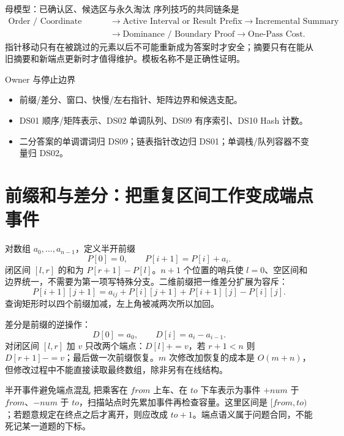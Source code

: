 \documentclass[UTF8,fontset=none,11pt,a4paper]{ctexart}
\begin{document}

\begin{corebox}{母模型：已确认区、候选区与永久淘汰}
序列技巧的共同链条是
\[
\begin{aligned}
\text{Order / Coordinate Contract}
&\to\text{Active Interval or Result Prefix}
\to\text{Incremental Summary}\\
&\to\text{Dominance / Boundary Proof}
\to\text{One-Pass Cost}.
\end{aligned}
\]
指针移动只有在被跳过的元素以后不可能重新成为答案时才安全；摘要只有在能从旧摘要和新端点更新时才值得维护。模板名称不是正确性证明。
\end{corebox}

\begin{methodbox}{Owner 与停止边界}
\begin{itemize}
\item {}前缀/差分、窗口、快慢/左右指针、矩阵边界和候选支配。
\item {}DS01 顺序/矩阵表示、DS02 单调队列、DS09 有序索引、DS10 Hash 计数。
\item {}二分答案的单调谓词归 DS09；链表指针改边归 DS01；单调栈/队列容器不变量归 DS02。
\end{itemize}
\end{methodbox}
\tableofcontents\newpage

\section{前缀和与差分：把重复区间工作变成端点事件}

对数组 $a_0,\ldots,a_{n-1}$，定义半开前缀
\[
P[0]=0,\qquad P[i+1]=P[i]+a_i.
\]
闭区间 $[l,r]$ 的和为 $P[r+1]-P[l]$。$n+1$ 个位置的哨兵使 $l=0$、空区间和边界统一，不需要为第一项写特殊分支。二维前缀把一维差分扩展为容斥：
\[
P[i+1][j+1]=a_{ij}+P[i][j+1]+P[i+1][j]-P[i][j].
\]
查询矩形时以四个前缀加减，左上角被减两次所以加回。

差分是前缀的逆操作：
\[
D[0]=a_0,\qquad D[i]=a_i-a_{i-1}.
\]
对闭区间 $[l,r]$ 加 $v$ 只改两个端点：$D[l]+=v$，若 $r+1<n$ 则 $D[r+1]-=v$；最后做一次前缀恢复。$m$ 次修改加恢复的成本是 $O(m+n)$，但修改过程中不能直接读取最终数组，除非另有在线结构。

\begin{examplebox}{半开事件避免端点混乱}
把乘客在 $from$ 上车、在 $to$ 下车表示为事件 $+num$ 于 $from$、$-num$ 于 $to$，扫描站点时先累加事件再检查容量。这里区间是 $[from,to)$；若题意规定在终点之后才离开，则应改成 $to+1$。端点语义属于问题合同，不能死记某一道题的下标。
\end{examplebox}
\end{document}
